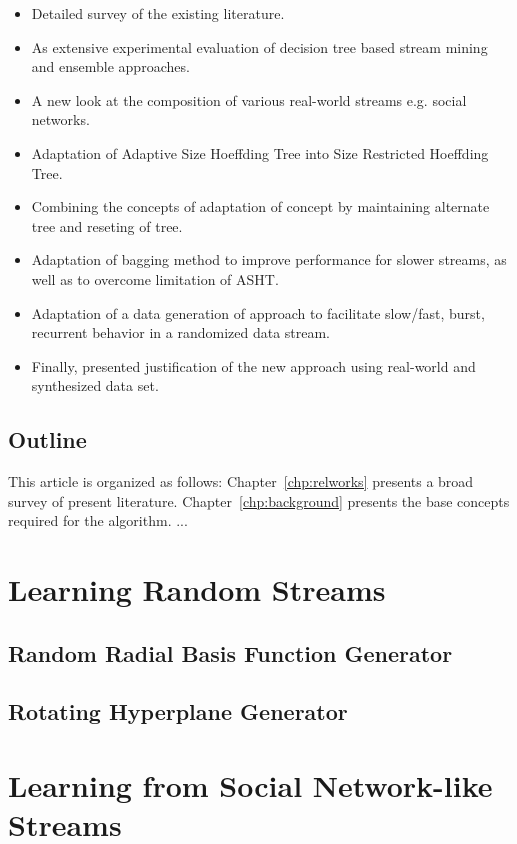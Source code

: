 \documentclass[a4paper, 11pt, oneside]{book}
\begin{document}
\begin{itemize}
    \item Detailed survey of the existing literature.
    \item As extensive experimental evaluation of decision tree based stream mining and ensemble approaches.
    \item A new look at the composition of various real-world streams e.g. social networks.
    \item Adaptation of Adaptive Size Hoeffding Tree into Size Restricted Hoeffding Tree.
    \item Combining the concepts of adaptation of concept by maintaining alternate tree and reseting of tree.
    \item Adaptation of bagging method to improve performance for slower streams, as well as to overcome limitation of ASHT.
    \item Adaptation of a data generation of approach to facilitate slow/fast, burst, recurrent behavior in a randomized data stream.
    \item Finally, presented justification of the new approach using real-world and synthesized data set.
\end{itemize}


\section{Outline}
This article is organized as follows: Chapter~\ref{chp:relworks} presents a broad survey of present literature. Chapter~\ref{chp:background} presents the base concepts required for the algorithm. ...





\chapter{Learning Random Streams}
\section{Random Radial Basis Function Generator}
\section{Rotating Hyperplane Generator}


\chapter{Learning from Social Network-like Streams}
\end{document}
